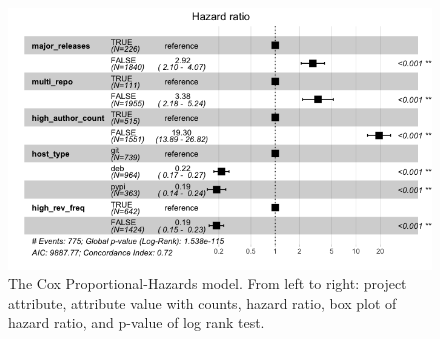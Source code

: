 \documentclass[sigconf,review]{acmart}
\begin{document}
\begin{figure}
    \centering
    \includegraphics[scale=0.45, keepaspectratio=true]{img/CoxHR-table.jpg}
    \caption{The Cox Proportional-Hazards model. From left to right: project attribute, attribute value with counts, hazard ratio, box plot of hazard ratio, and p-value of log rank test.}
    \label{fig:Cox}
\end{figure}
\end{document}

